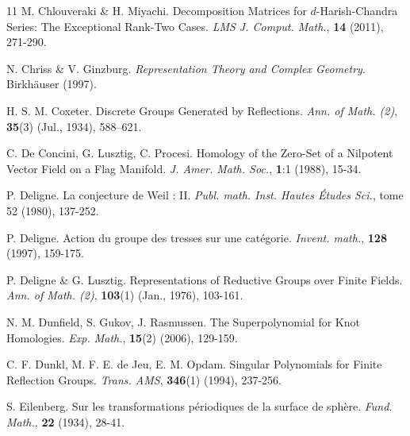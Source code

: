 \documentclass[a4paper,10pt,leqno]{amsart}
\theoremstyle{plain}
\theoremstyle{plain}
\theoremstyle{plain}
\theoremstyle{definition}
\theoremstyle{remark}
\begin{document}
\begin{thebibliography}{11}
	M. Chlouveraki \& H. Miyachi.
	Decomposition Matrices for $d$-Harish-Chandra Series: The Exceptional Rank-Two Cases.
	\textsl{LMS J. Comput. Math.},
	\textbf{14}
	(2011),
	271-290.

	N. Chriss \& V. Ginzburg.
	\textsl{Representation Theory and Complex Geometry}.
	Birkh\"auser
	(1997).
	
	H. S. M. Coxeter.
	Discrete Groups Generated by Reflections.
	\textsl{Ann. of Math. (2)}, 
	\textbf{35}(3)
	(Jul., 1934),
	588–621.


	C. De Concini, G. Lusztig, C. Procesi.
	Homology of the Zero-Set of a Nilpotent Vector Field on a Flag Manifold.
	\textsl{J. Amer. Math. Soc.},
	\textbf{1}:1
	(1988),
	15-34.


	P. Deligne.
	La conjecture de Weil : II.
	\textsl{Publ. math. Inst. Hautes \'Etudes Sci.},
	tome 52 
	(1980),
	137-252.
	
	P. Deligne.
	Action du groupe des tresses sur une cat\'egorie.
	\textsl{Invent. math.},
	\textbf{128}
	(1997),
	159-175.
	
	P. Deligne \& G. Lusztig.
	Representations of Reductive Groups over Finite Fields.
	\textsl{Ann. of Math. (2)},
	\textbf{103}(1)
	(Jan., 1976),
	103-161.
	
	N. M. Dunfield, S. Gukov, J. Rasmussen.
	The Superpolynomial for Knot Homologies.
	\textsl{Exp. Math.},
	\textbf{15}(2)
	(2006),
	129-159.
	
	C. F. Dunkl, M. F. E. de Jeu, E. M. Opdam.
	Singular Polynomials for Finite Reflection Groups.
	\textsl{Trans. AMS},
	\textbf{346}(1)
	(1994),
	237-256.


	S. Eilenberg.
	Sur les transformations p\'eriodiques de la surface de sph\`ere.
	\textsl{Fund. Math.},
	\textbf{22}
	(1934),
	28-41.
	

\end{thebibliography}
\end{document}

